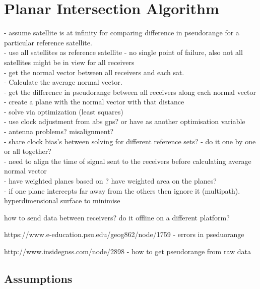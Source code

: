 \documentclass[11pt,a4paper]{article}
\begin{document}

\section{Planar Intersection Algorithm}

- assume satellite is at infinity for comparing difference in pseudorange for a particular reference satellite.\\
- use all satellites as reference satellite - no single point of failure, also not all satellites might be in view for all receivers\\
- get the normal vector between all receivers and each sat. \\
- Calculate the average normal vector.\\
- get the difference in pseudorange between all receivers along each normal vector \\
- create a plane with the normal vector with that distance\\
- solve via optimization (least squares) \\
- use clock adjustment from abs gps? or have as another optimisation variable\\
- antenna problems? misalignment?\\
- share clock bias's between solving for different reference sets? - do it one by one or all together?\\
- need to align the time of signal sent to the receivers before calculating average normal vector\\

- have weighted planes based on ? have weighted area on the planes?\\
- if one plane intercepts far away from the others then ignore it (multipath). hyperdimensional surface to minimise




how to send data between receivers? do it offline on a different platform?


https://www.e-education.psu.edu/geog862/node/1759 - errors in pseduorange

http://www.insidegnss.com/node/2898 - how to get pseudorange from raw data

\subsection{Assumptions}
\end{document}
